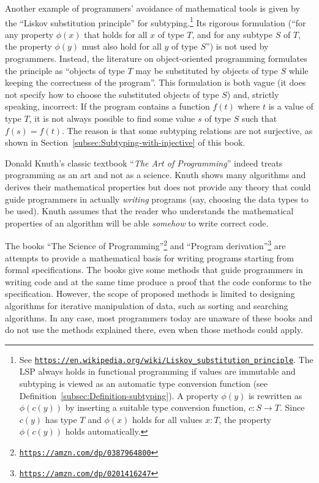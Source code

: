 Another example of programmers\textsf{'} avoidance of mathematical tools is
given by the \textsf{``}Liskov substitution principle\textsf{''}
for subtyping.\footnote{See \texttt{\href{https://en.wikipedia.org/wiki/Liskov_substitution_principle}{https://en.wikipedia.org/wiki/Liskov\_substitution\_principle}}.
The LSP always holds in functional programming if values are immutable
and subtyping is viewed as an automatic type conversion function (see
Definition~\ref{subsec:Definition-subtyping}). A property $\phi(y)$
is rewritten as $\phi(c(y))$ by inserting a suitable type conversion
function, $c:S\rightarrow T$. Since $c(y)$ has type $T$ and $\phi(x)$
holds for all values $x:T$,  the property $\phi(c(y))$ holds automatically.} Its rigorous formulation (\textsf{``}for any property $\phi(x)$ that holds
for all $x$ of type $T$, and for any subtype $S$ of $T$, the property
$\phi(y)$ must also hold for all $y$ of type $S$\textsf{''}) is not used
by programmers. Instead, the literature on object-oriented programming
formulates the principle as \textsf{``}objects of type $T$ may be substituted
by objects of type $S$ while keeping the correctness of the program\textsf{''}.
This formulation  is both vague
(it does not specify how to choose the substituted objects of type
$S$) and, strictly speaking, incorrect: If the program contains a
function $f(t)$ where $t$ is a value of type $T$, it is not always
possible to find some value $s$ of type $S$ such that $f(s)=f(t)$.
The reason is that some subtyping relations are not surjective, as
shown in Section~\ref{subsec:Subtyping-with-injective} of this book.

Donald Knuth\textsf{'}s classic textbook \textsf{``}\emph{The Art of Programming}\textsf{''}
indeed treats programming as an art and not as a science. Knuth shows
many algorithms and derives their mathematical properties but does
not provide any theory that could guide programmers in actually \emph{writing}
programs (say, choosing the data types to be used). Knuth assumes
that the reader who understands the mathematical properties of an
algorithm will be able \emph{somehow} to write correct code.

The books \textsf{``}The Science of Programming\textsf{''}\footnote{\texttt{\href{https://amzn.com/dp/0387964800}{https://amzn.com/dp/0387964800}}}
and \textsf{``}Program derivation\textsf{''}\footnote{\texttt{\href{https://amzn.com/dp/0201416247}{https://amzn.com/dp/0201416247}}}
are attempts to provide a mathematical basis for writing programs
starting from formal specifications. The books give some methods that
guide programmers in writing code and at the same time produce a proof
that the code conforms to the specification. However, the scope of
proposed methods is limited to designing algorithms for iterative
manipulation of data, such as sorting and searching algorithms. In
any case, most programmers today are unaware of these books and do
not use the methods explained there, even when those methods could
apply.

